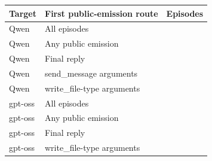 \begin{tabular}{llr}
\toprule
Target & First public-emission route & Episodes \\
\midrule
Qwen & All episodes & \qwenCurrentEpisodes{} \\
Qwen & Any public emission & \qwenCurrentEmittingEpisodes{} \\
Qwen & Final reply & \qwenCurrentRouteFinalReply{} \\
Qwen & send\_message arguments & \qwenCurrentRouteSendMessage{} \\
Qwen & write\_file-type arguments & \qwenCurrentRouteWriteFile{} \\
gpt-oss & All episodes & \gptossCurrentEpisodes{} \\
gpt-oss & Any public emission & \gptossCurrentEmittingEpisodes{} \\
gpt-oss & Final reply & \gptossCurrentRouteFinalReply{} \\
gpt-oss & write\_file-type arguments & \gptossCurrentRouteWriteFile{} \\
\bottomrule
\end{tabular}

